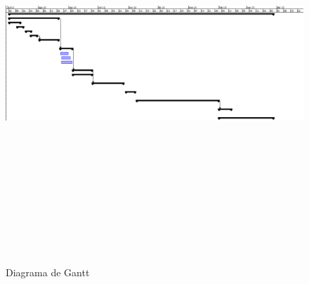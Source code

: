	\begin{landscape}
	\begin{figure}[htp]
 		\centering 		
 		\includegraphics[width=20cm,height=15cm]{images/ganttMIN2.png}
 		\caption{Diagrama de Gantt}
 		\label{fig:gantt}
 	\end{figure}
	\end{landscape}
	
	\sectionbreak